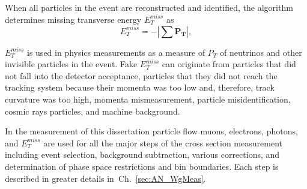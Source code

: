 When all particles in the event are reconstructed and identified, the algorithm determines missing transverse energy $E_T^{miss}$ as 
\begin{equation}\label{eq:MET}
  E_T^{miss} = - | \sum \mathbf{P_T} |,
\end{equation}

$E_T^{miss}$ is used in physics measurements as a measure of $P_T$ of neutrinos and other invisible particles in the event. Fake $E_T^{miss}$ can originate from particles that did not fall into the detector acceptance, particles that they did not reach the tracking system because their momenta was too low and, therefore, track curvature was too high, momenta mismeasurement, particle misidentification, cosmic rays particles, and machine background.

In the measurement of this dissertation particle flow muons, electrons, photons, and $E_T^{miss}$ are used for all the major steps of the cross section measurement including event selection, background subtraction, various corrections, and determination of phase space restrictions and bin boundaries. Each step is described in greater details in~Ch.~\ref{sec:AN_WgMeas}. 

